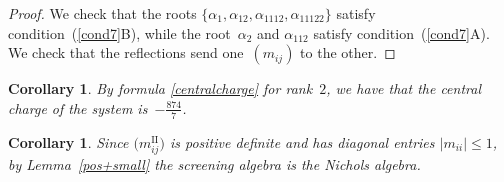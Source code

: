 \documentclass[10pt,a4paper]{amsart}
\numberwithin{equation}{section}
\newtheorem{cor}[teo]{Corollary}
\begin{document}
\begin{proof}
We check that the roots $\lbrace \alpha_1, \alpha_{12}, \alpha_{1112}, \alpha_{11122}\rbrace$ satisfy condition~(\ref{cond7}B), while the root~$\alpha_2$ and $\alpha_{112}$ satisfy condition~(\ref{cond7}A).
We check that the reflections send one~$(m_{ij})$ to the other.
\end{proof}
\begin{cor}
By formula \eqref{centralcharge} for rank~$2$, we have that the central charge of the system is~$-\frac{874}{7}$.
\end{cor}

\begin{cor}Since $\big(m_{ij}^{\mathrm{II}}\big)$ is positive definite and has diagonal entries $|m_{ii}|\leq 1$, by Lem\-ma~{\rm \ref{pos+small}} the screening algebra is the Nichols algebra.
\end{cor}
\end{document}
